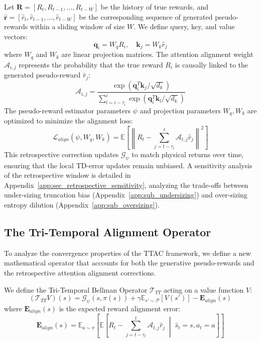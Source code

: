 \documentclass[manuscript, screen, review]{jair}
\begin{document}
Let $\mathbf{R} = [R_t, R_{t-1}, \dots, R_{t-W}]$ be the history of true rewards, and $\mathbf{\hat{r}} = [\hat{r}_t, \hat{r}_{t-1}, \dots, \hat{r}_{t-W}]$ be the corresponding sequence of generated pseudo-rewards within a sliding window of size $W$. We define query, key, and value vectors:
\begin{equation}
    \mathbf{q}_i = W_q R_i, \quad \mathbf{k}_j = W_k \hat{r}_j
\end{equation}
where $W_q$ and $W_k$ are linear projection matrices. The attention alignment weight $\mathcal{A}_{i, j}$ represents the probability that the true reward $R_i$ is causally linked to the generated pseudo-reward $\hat{r}_j$:
\begin{equation}
    \mathcal{A}_{i, j} = \frac{\exp\left( \mathbf{q}_i^T \mathbf{k}_j / \sqrt{d_k} \right)}{\sum_{l=i-\tau_i}^{i} \exp\left( \mathbf{q}_i^T \mathbf{k}_l / \sqrt{d_k} \right)}
\end{equation}
The pseudo-reward estimator parameters $\psi$ and projection parameters $W_q, W_k$ are optimized to minimize the alignment loss:
\begin{equation}
    \mathcal{L}_{align}(\psi, W_q, W_k) = \mathbb{E} \left[ \left\| R_t - \sum_{j=t-\tau_t}^{t} \mathcal{A}_{t, j} \hat{r}_j \right\|^2 \right]
\end{equation}
This retrospective correction updates $\mathcal{G}_\psi$ to match physical returns over time, ensuring that the local TD-error updates remain unbiased. A sensitivity analysis of the retrospective window is detailed in Appendix~\ref{app:sec_retrospective_sensitivity}, analyzing the trade-offs between under-sizing truncation bias (Appendix~\ref{app:sub_undersizing}) and over-sizing entropy dilution (Appendix~\ref{app:sub_oversizing}).

\subsection{The Tri-Temporal Alignment Operator}
To analyze the convergence properties of the TTAC framework, we define a new mathematical operator that accounts for both the generative pseudo-rewards and the retrospective attention alignment corrections.

We define the Tri-Temporal Bellman Operator $\mathcal{T}_{TT}$ acting on a value function $V$:
\begin{equation}
    \left( \mathcal{T}_{TT} V \right)(s) = \mathcal{G}_\psi(s, \pi(s)) + \gamma \mathbb{E}_{s' \sim \mathcal{P}} \left[ V(s') \right] - \mathbf{E}_{align}(s)
\end{equation}
where $\mathbf{E}_{align}(s)$ is the expected reward alignment error:
\begin{equation}
    \mathbf{E}_{align}(s) = \mathbb{E}_{a \sim \pi} \left[ \mathbb{E} \left[ R_t - \sum_{j=t-\tau_t}^{t} \mathcal{A}_{t, j} \hat{r}_j \;\middle|\; \hat{s}_t = s, a_t = a \right] \right]
\end{equation}
\end{document}
